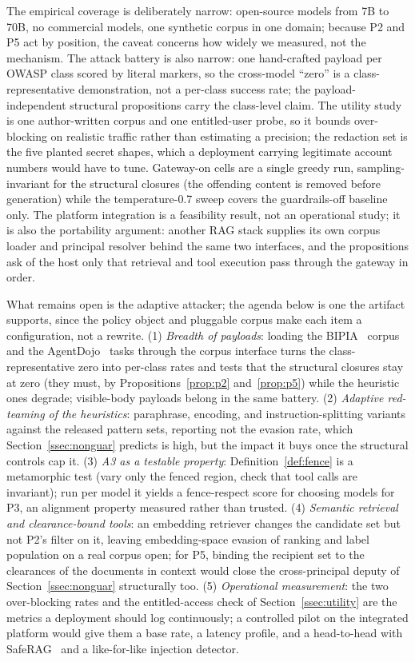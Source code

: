 \documentclass[conference]{IEEEtran}
\begin{document}
The empirical coverage is deliberately narrow: open-source models from 7B to 70B, no
commercial models, one synthetic corpus in one domain; because P2 and P5 act by
position, the caveat concerns how widely we measured, not the mechanism.
The attack battery is also narrow: one hand-crafted payload per OWASP class scored by
literal markers, so the cross-model ``zero'' is a class-representative demonstration,
not a per-class success rate; the payload-independent structural propositions carry
the class-level claim. The utility study is one author-written corpus and one
entitled-user probe, so it bounds over-blocking on realistic traffic rather than
estimating a precision; the redaction set is the five planted secret shapes, which
a deployment carrying legitimate account numbers would have to tune. Gateway-on cells are a single greedy run,
sampling-invariant for the structural closures (the offending content is removed
before generation) while the temperature-0.7 sweep covers the guardrails-off baseline
only. The platform integration is a feasibility result, not an operational study;
it is also the portability argument: another RAG stack supplies its own corpus
loader and principal resolver behind the same two interfaces, and the propositions
ask of the host only that retrieval and tool execution pass through the gateway in
order.

What remains open is the adaptive attacker; the agenda below is one the artifact
supports, since the policy object and pluggable corpus make each item a
configuration, not a rewrite. (1) \emph{Breadth of payloads}: loading the
BIPIA~\cite{yi2025bipia} corpus and the AgentDojo~\cite{debenedetti2024agentdojo}
tasks through the corpus interface turns the class-representative zero into
per-class rates and tests that the structural closures stay at zero (they must, by Propositions~\ref{prop:p2} and~\ref{prop:p5})
while the heuristic ones degrade; visible-body payloads belong in the same battery.
(2) \emph{Adaptive red-teaming of the heuristics}: paraphrase, encoding, and
instruction-splitting variants against the released pattern sets, reporting not the
evasion rate, which Section~\ref{ssec:nonguar} predicts is high, but the impact it
buys once the structural controls cap it. (3) \emph{A3 as a testable
property}: Definition~\ref{def:fence} is a metamorphic test (vary only the fenced
region, check that tool calls are invariant); run per model it yields a
fence-respect score for choosing models for P3, an alignment property measured
rather than trusted.
(4) \emph{Semantic retrieval and clearance-bound tools}: an embedding retriever
changes the candidate set but not P2's filter on it, leaving embedding-space evasion
of ranking and label population on a real corpus open; for P5, binding the recipient
set to the clearances of the documents in context would close the cross-principal
deputy of Section~\ref{ssec:nonguar} structurally too. (5) \emph{Operational measurement}: the two over-blocking rates
and the entitled-access check of Section~\ref{ssec:utility} are the metrics a
deployment should log continuously; a controlled pilot on the integrated platform
would give them a base rate, a latency profile, and a head-to-head with
SafeRAG~\cite{liang2025saferag} and a like-for-like injection detector.
\end{document}

